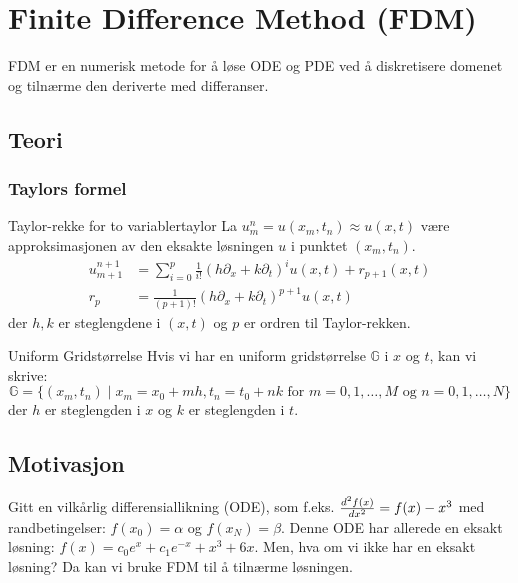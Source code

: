 \chapter{Finite Difference Method (FDM)}
FDM er en numerisk metode for å løse ODE og PDE ved å diskretisere domenet og tilnærme den deriverte med differanser.

\section{Teori}
\subsection{Taylors formel}
\begin{theorem}{Taylor-rekke for to variabler}{taylor}
	La \(u_m^{n} = u(x_m, t_n) \approx u(x, t)\) være approksimasjonen av den eksakte løsningen \(u\) i punktet \((x_m, t_n)\).
	\begin{align} \label{eq:taylor}
		u_{m+1}^{n+1} &= \sum_{i=0}^{p} \frac{1}{i!} \left(h \partial_x + k \partial_t\right)^i u(x, t) + r_{p+1}(x, t) \tag{taylor} \\
		r_p & = \frac{1}{(p+1)!} \left(h \partial_x + k \partial_t\right)^{p+1} u(x, t) \tag{rest}
	\end{align}
	der \(h, k\) er steglengdene i \((x, t)\) og \(p\) er ordren til Taylor-rekken.
\end{theorem}
\begin{remark*}{Uniform Gridstørrelse}{}
	Hvis vi har en uniform gridstørrelse \(\mathbb{G}\) i \(x\) og \(t\), kan vi skrive:
	\[\mathbb{G} = \{(x_m, t_n) \mid x_m = x_0 + mh, t_n = t_0 + nk \text{ for } m = 0, 1, \ldots, M \text{ og } n = 0, 1, \ldots, N\}\]
	der \(h\) er steglengden i \(x\) og \(k\) er steglengden i \(t\).
\end{remark*}

\section{Motivasjon}
Gitt en vilkårlig differensiallikning (ODE), som f.eks. \( \ddn[f(x)]{2}{x} = f(x) - x^3 \)\label{eq:ode} med randbetingelser: \( f(x_0) = \alpha \) og \( f(x_N) = \beta \).
Denne ODE har allerede en eksakt løsning: \( f(x) = c_0e^x + c_1e^{-x} + x^3 + 6x \)\label{eq:exact}.
Men, hva om vi ikke har en eksakt løsning? Da kan vi bruke FDM til å tilnærme løsningen.

